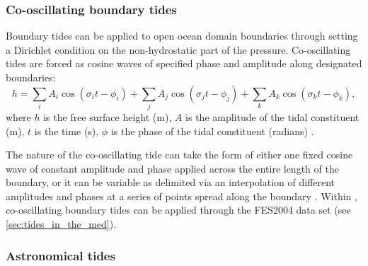 \subsubsection{Co-oscillating boundary tides}
\label{sec:boundary_tide}

Boundary tides can be applied to open ocean domain boundaries through setting a Dirichlet condition on the non-hydrostatic part of the pressure. Co-oscillating tides are forced as cosine waves of specified phase and amplitude along designated boundaries:
\begin{equation}
h=\sum_{i}A_{i}\cos(\sigma_{i} t -\phi_{i})
+\sum_{j}A_{j}\cos(\sigma_{j} t -\phi_{j})
+\sum_{k}A_{k}\cos(\sigma_{k} t -\phi_{k}),
\label{eq:co-oscillating-tide}
\end{equation}
where $h$ is the free surface height (m), $A$ is the amplitude of the tidal 
constituent (m), $t$ is the time (s), $\phi$ is the phase of the tidal constituent 
(radians) \citep{Wells2008}. 
 
The nature of the co-oscillating tide can take the form of either one fixed cosine wave of constant amplitude 
and phase applied across the entire length of the boundary, or it can be variable as delimited via an 
interpolation of different amplitudes and phases at a series of points spread along the boundary \citep{Wells2008}.
Within \fluidity, co-oscillating boundary tides can be applied through \eg the FES2004 data set (see \ref{sec:tides_in_the_med}).

\subsubsection{Astronomical tides}\label{sec:AST}
\label{astronomical}

